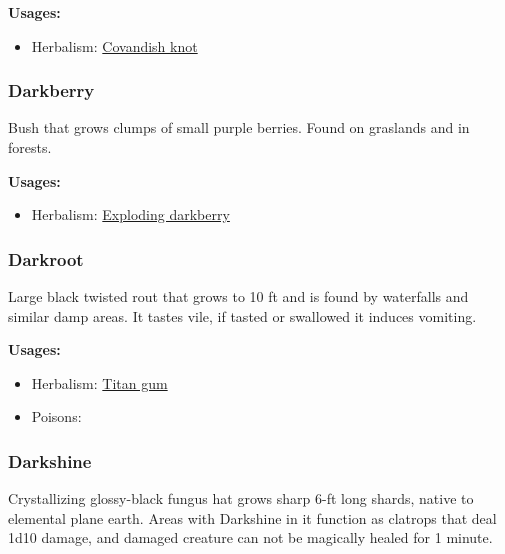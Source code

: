 \textbf{Usages:}

\begin{itemize}[noitemsep]
\item[] Herbalism: \hyperref[Covandish knot]{Covandish knot}
\end{itemize}

\subsubsection{Darkberry}
\label{Darkberry}

Bush that grows clumps of small purple berries. Found on graslands and in forests.

\vspace{5mm}

\textbf{Usages:}

\begin{itemize}[noitemsep]
\item[] Herbalism: \hyperref[Exploding darkberry]{Exploding darkberry}
\end{itemize}

\subsubsection{Darkroot}
\label{Darkroot}

Large black twisted rout that grows to 10 ft and is found by waterfalls and similar damp areas. It tastes vile, if tasted or swallowed it induces vomiting.

\vspace{5mm}

\textbf{Usages:}

\begin{itemize}[noitemsep]
\item[] Herbalism: \hyperref[Titan gum]{Titan gum}
\item[] Poisons: \poison
\end{itemize}

\subsubsection{Darkshine}
\label{Darkshine}

Crystallizing glossy-black fungus hat grows sharp 6-ft long shards, native to elemental plane earth. Areas with Darkshine in it function as clatrops that deal 1d10 damage, and damaged creature can not be magically healed for 1 minute.

\vspace{5mm}

